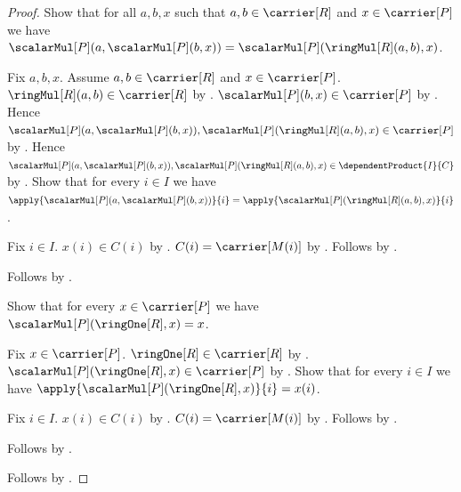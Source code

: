 \begin{proof}
    Show that for all $a,b,x$ such that $a,b\in\carrier[R]$ and
        $x\in\carrier[P]$ we have
        $\scalarMul[P](a,\scalarMul[P](b,x))
            =\scalarMul[P](\ringMul[R](a,b),x)$.
    \begin{subproof}
        Fix $a,b,x$.
        Assume $a,b\in\carrier[R]$ and $x\in\carrier[P]$.
        $\ringMul[R](a,b)\in\carrier[R]$ by .
        $\scalarMul[P](b,x)\in\carrier[P]$ by
            .
        Hence
            $\scalarMul[P](a,\scalarMul[P](b,x)),
                \scalarMul[P](\ringMul[R](a,b),x)
            \in\carrier[P]$ by
            .
        Hence
            $\scalarMul[P](a,\scalarMul[P](b,x)),
                \scalarMul[P](\ringMul[R](a,b),x)
            \in\dependentProduct{I}{C}$ by .
        Show that for every $i\in I$ we have
            $\apply{\scalarMul[P](a,\scalarMul[P](b,x))}{i}
                =\apply{\scalarMul[P](\ringMul[R](a,b),x)}{i}$.
        \begin{subproof}
            Fix $i\in I$.
            $x(i)\in C(i)$ by
                .
            $C(i)=\carrier[M(i)]$ by
                .
            Follows by
                .
        \end{subproof}
        Follows by .
    \end{subproof}

    Show that for every $x\in\carrier[P]$ we have
        $\scalarMul[P](\ringOne[R],x)=x$.
    \begin{subproof}
        Fix $x\in\carrier[P]$.
        $\ringOne[R]\in\carrier[R]$ by .
        $\scalarMul[P](\ringOne[R],x)\in\carrier[P]$ by
            .
        Show that for every $i\in I$ we have
            $\apply{\scalarMul[P](\ringOne[R],x)}{i}=x(i)$.
        \begin{subproof}
            Fix $i\in I$.
            $x(i)\in C(i)$ by
                .
            $C(i)=\carrier[M(i)]$ by
                .
            Follows by
                .
        \end{subproof}
        Follows by .
    \end{subproof}
    Follows by .
\end{proof}

